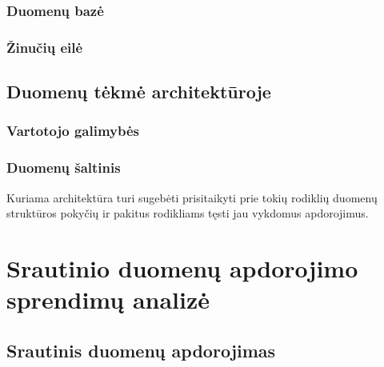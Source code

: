 \documentclass{VUMIFPSbakalaurinis}
\begin{document}
\subsubsection{Duomenų bazė}

\subsubsection{Žinučių eilė}


\subsection{Duomenų tėkmė architektūroje}

\subsubsection{Vartotojo galimybės}

\subsubsection{Duomenų šaltinis}

Kuriama architektūra turi sugebėti prisitaikyti prie tokių rodiklių duomenų struktūros pokyčių ir pakitus rodikliams tęsti jau vykdomus apdorojimus. 

\section{Srautinio duomenų apdorojimo sprendimų analizė}

\subsection{Srautinis duomenų apdorojimas} \label{strprocess}
\end{document}
